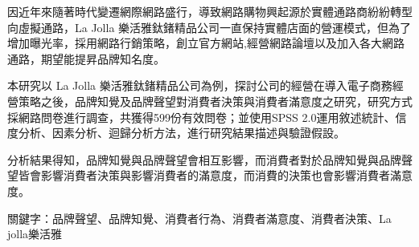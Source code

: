 因近年來隨著時代變遷網際網路盛行，導致網路購物興起源於實體通路商紛紛轉型向虛擬通路，La Jolla 樂活雅鈦鍺精品公司一直保持實體店面的營運模式，但為了增加曝光率，採用網路行銷策略，創立官方網站,經營網路論壇以及加入各大網路通路，期望能提昇品牌知名度。

本研究以 La Jolla 樂活雅鈦鍺精品公司為例，探討公司的經營在導入電子商務經營策略之後，品牌知覺及品牌聲望對消費者決策與消費者滿意度之研究，研究方式採網路問卷進行調查，共獲得599份有效問卷；並使用SPSS 2.0運用敘述統計、信度分析、因素分析、迴歸分析方法，進行研究結果描述與驗證假設。

分析結果得知，品牌知覺與品牌聲望會相互影響，而消費者對於品牌知覺與品牌聲望皆會影響消費者決策與影響消費者的滿意度，而消費的決策也會影響消費者滿意度。

關鍵字：品牌聲望、品牌知覺、消費者行為、消費者滿意度、消費者決策、La jolla樂活雅
